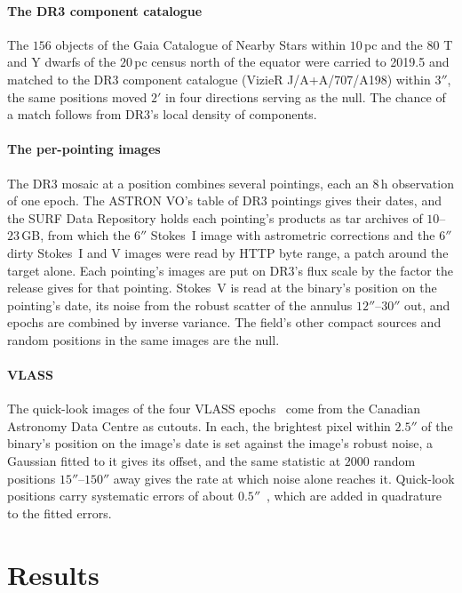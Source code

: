 \documentclass[3p,11pt]{elsarticle}
\begin{document}
\paragraph{The DR3 component catalogue} The $156$ objects of the Gaia Catalogue of
Nearby Stars within $10$\,pc and the $80$ T and Y dwarfs of the $20$\,pc census north of
the equator were carried to 2019.5 and matched to the DR3 component catalogue (VizieR
J/A+A/707/A198) within $3''$, the same positions moved $2'$ in four directions serving as
the null. The chance of a match follows from DR3's local density of components.

\paragraph{The per-pointing images} The DR3 mosaic at a position combines several
pointings, each an $8$\,h observation of one epoch. The ASTRON VO's table of DR3
pointings gives their dates, and the SURF Data Repository holds each pointing's products
as tar archives of $10$--$23$\,GB, from which the $6''$ Stokes~I image with astrometric
corrections and the $6''$ dirty Stokes~I and V images were read by HTTP byte range, a
patch around the target alone. Each pointing's images are put on DR3's flux scale by the
factor the release gives for that pointing. Stokes~V is read at the binary's position on
the pointing's date, its noise from the robust scatter of the annulus $12''$--$30''$ out,
and epochs are combined by inverse variance. The field's other compact sources and
random positions in the same images are the null.

\paragraph{VLASS} The quick-look images of the four VLASS epochs~\cite{Lacy2020} come
from the Canadian Astronomy Data Centre as cutouts. In each, the brightest pixel within
$2.5''$ of the binary's position on the image's date is set against the image's robust
noise, a Gaussian fitted to it gives its offset, and the same statistic at $2000$ random
positions $15''$--$150''$ away gives the rate at which noise alone reaches it. Quick-look
positions carry systematic errors of about $0.5''$~\cite{Gordon2021}, which are added in
quadrature to the fitted errors.

\section{Results}\label{sec:results}
\end{document}
